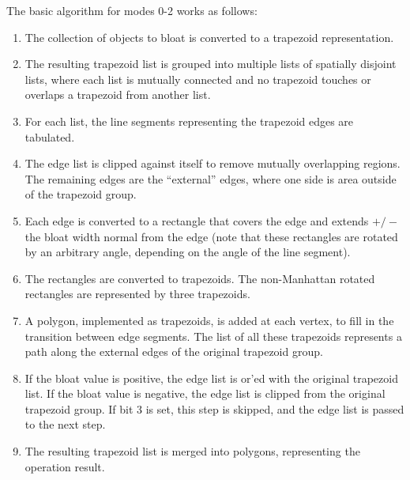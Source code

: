 The basic algorithm for modes 0-2 works as follows:
\begin{enumerate}
\item{The collection of objects to bloat is converted to a trapezoid
    representation.}
\item{The resulting trapezoid list is grouped into multiple lists of
    spatially disjoint lists, where each list is mutually connected   
    and no trapezoid touches or overlaps a trapezoid from another list.}
\item{For each list, the line segments representing the trapezoid edges
    are tabulated.}
\item{The edge list is clipped against itself to remove mutually
    overlapping regions.  The remaining edges are the ``external''
    edges, where one side is area outside of the trapezoid group.}
\item{Each edge is converted to a rectangle that covers the edge and
    extends $+/-$ the bloat width normal from the edge (note that these
    rectangles are rotated by an arbitrary angle, depending on the
    angle of the line segment).}
\item{The rectangles are converted to trapezoids.  The non-Manhattan
    rotated rectangles are represented by three trapezoids.}
\item{A polygon, implemented as trapezoids, is added at each vertex,
    to fill in the transition between edge segments.  The list of all
    these trapezoids represents a path along the external edges of the
    original trapezoid group.}
\item{If the bloat value is positive, the edge list is or'ed with
    the original trapezoid list.  If the bloat value is negative, the
    edge list is clipped from the original trapezoid group.  If bit 3
    is set, this step is skipped, and the edge list is passed to the
    next step.}
\item{The resulting trapezoid list is merged into polygons,
    representing the operation result.}
\end{enumerate}


